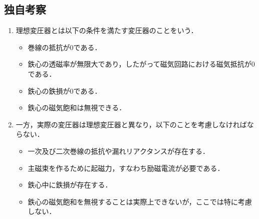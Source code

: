 \subsection{独自考察}
\begin{enumerate}[1.]
	\item 理想変圧器とは以下の条件を満たす変圧器のことをいう\cite{1130000795154912128}．
\begin{itemize}
	\item 巻線の抵抗が0である．
	\item 鉄心の透磁率が無限大であり，したがって磁気回路における磁気抵抗が0である．
	\item 鉄心の鉄損が0である．
	\item 鉄心の磁気飽和は無視できる．
\end{itemize}
\item 一方，実際の変圧器は理想変圧器と異なり，以下のことを考慮しなければならない\cite{1130154912128}．
\begin{itemize}
	\item 一次及び二次巻線の抵抗や漏れリアクタンスが存在する．
	\item 主磁束を作るために起磁力，すなわち励磁電流が必要である．
	\item 鉄心中に鉄損が存在する．
	\item 鉄心の磁気飽和を無視することは実際上できないが，ここでは特に考慮しない．
\end{itemize}
\end{enumerate}